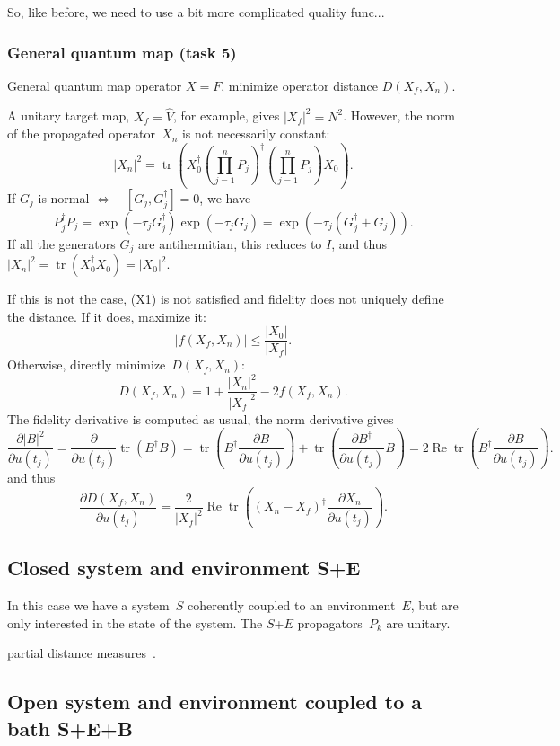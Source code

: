 \documentclass[aps, pra, a4paper, longbibliography]{revtex4}
\newcommand{\I}{I}
\newcommand{\be}{\begin{equation}}
\newcommand{\ee}{\end{equation}}
\newcommand{\eq}{\Leftrightarrow}
\DeclareMathOperator{\tr}{tr}
\DeclareMathOperator{\re}{Re}
\newcommand{\dd}[2]{\frac{\partial #1}{\partial #2}}
\begin{document}
So, like before, we need to use a bit more complicated quality func...



\subsubsection{General quantum map (task 5)}

General quantum map operator $X = F$,
minimize operator distance $D(X_f, X_n)$.

A unitary target map,
$X_f = \hat{V}$, for example, gives $|X_f|^2 = N^2$.
However, the norm of the propagated operator~$X_n$ is not necessarily constant:
\be
|X_n|^2 = \tr\left(X_0^\dagger \left(\prod_{j=1}^{n} P_j\right)^\dagger \left(\prod_{j=1}^{n} P_j\right) X_0\right).
\ee
If $G_j$ is normal $\eq \quad [G_j, G^\dagger_j] = 0$, we have
\be
P_j^\dagger P_j
= \exp(-\tau_j G^\dagger_j) \exp(-\tau_j G_j)
= \exp(-\tau_j (G_j^\dagger + G_j)).
\ee
If all the generators $G_j$ are antihermitian, this reduces to $\I$, and thus
$|X_n|^2 = \tr(X_0^\dagger X_0) = |X_0|^2$.

If this is not the case, (X1) is not satisfied and fidelity does not uniquely define the distance.
If it does, maximize it:
\be
|f(X_f, X_n)| \le \frac{|X_0|}{|X_f|}.
\ee
Otherwise, directly minimize~$D(X_f, X_n)$:
\be
D(X_f, X_n) = 1 +\frac{|X_n|^2}{|X_f|^2} -2 f(X_f, X_n).
\ee
The fidelity derivative is computed as usual, the norm derivative gives
\be
\dd{|B|^2}{u(t_j)}
= \dd{}{u(t_j)} \tr(B^\dagger B)
= \tr\left(B^\dagger \dd{B}{u(t_j)}\right)
+\tr\left(\dd{B^\dagger}{u(t_j)} B \right)
= 2 \re \tr\left(B^\dagger \dd{B}{u(t_j)}\right).
\ee
and thus
\be
\dd{D(X_f, X_n)}{u(t_j)}
= \frac{2}{|X_f|^2} \re \tr\left((X_n-X_f)^\dagger \dd{X_n}{u(t_j)}\right).
\ee


\subsection{Closed system and environment S+E}

In this case we have a system~$S$ coherently coupled to an
environment~$E$, but are only interested in the state of the system.
The $S$+$E$ propagators~$P_k$ are unitary.

partial distance measures~\cite{kosut_2006}.

\subsection{Open system and environment coupled to a bath S+E+B}
\end{document}
